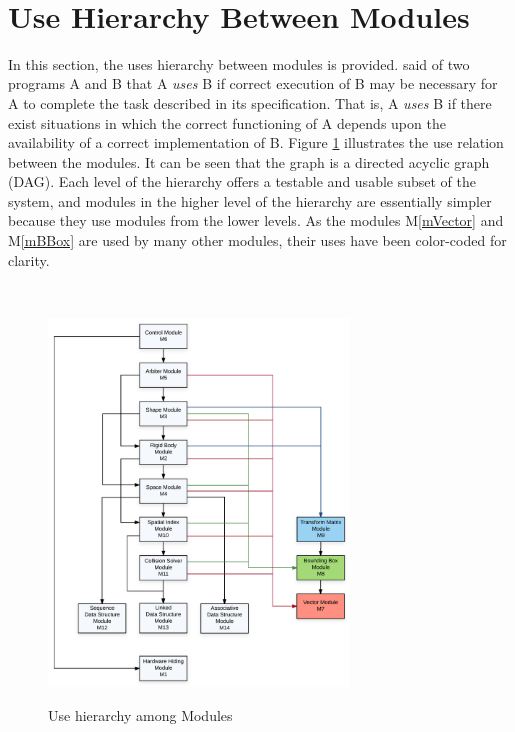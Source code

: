 \documentclass[12pt]{article}
\begin{document}
~\newpage

\section{Use Hierarchy Between Modules} \label{SecUse}

In this section, the uses hierarchy between modules is
provided. \citet{Parnas1978} said of two programs A and B that A {\em uses} B if correct execution of B may be necessary for A to complete the task described in its specification. That is, A {\em uses} B if there exist situations in which the correct functioning of A depends upon the availability of a correct implementation of B.  Figure \ref{Fig_uses} illustrates the use relation between the modules. It can be seen that the graph is a directed acyclic graph (DAG). Each level of the hierarchy offers a testable and usable subset of the system, and modules in the higher level of the hierarchy are essentially simpler because they use modules from the lower levels. As the modules M\ref{mVector} and M\ref{mBBox} are used by many other modules, their uses have been color-coded for clarity.

~\newpage
\begin{figure}[htbp]
\begin{center}
{
 \includegraphics[width=0.71\textwidth]{uses}
}
\caption{\label{Fig_uses}Use hierarchy among Modules}
\end{center}
\end{figure}
\end{document}

